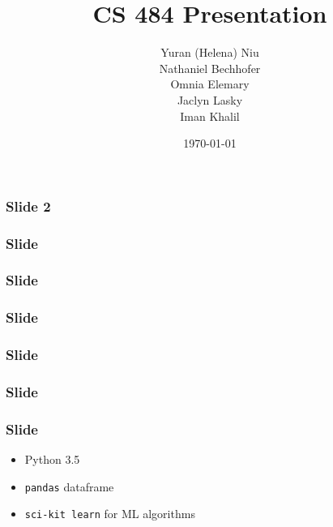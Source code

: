 \documentclass{beamer}
\title{CS 484 Presentation}
\author{Yuran (Helena) Niu \\ Nathaniel Bechhofer \\ Omnia Elemary \\ Jaclyn Lasky \\ Iman Khalil}
\date{\today}
\begin{document}
\frame{\titlepage} %



\frame %
{
  \frametitle{Slide 2}


}

\frame %
{
  \frametitle{Slide }


}

\frame %
{
  \frametitle{Slide }


}

\frame %
{
  \frametitle{Slide }


}

\frame %
{
  \frametitle{Slide }


}


\frame %
{
  \frametitle{Slide }

}

\frame %
{
  \frametitle{Slide }
  \begin{itemize}
  \item Python 3.5
  \item \texttt{pandas} dataframe
  \item \texttt{sci-kit learn} for ML algorithms
  \end{itemize}



}
\end{document}
